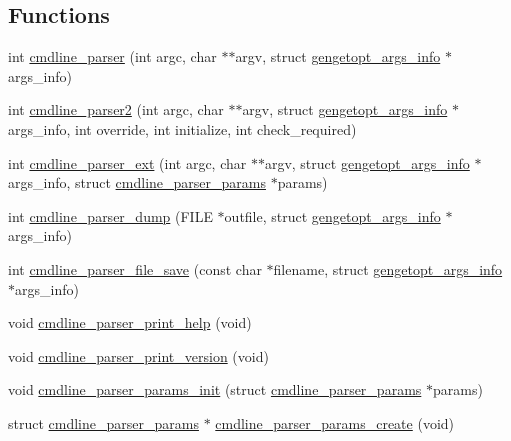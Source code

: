 \subsection*{Functions}
\begin{DoxyCompactItemize}
\item 
int \hyperlink{aes-getopt_8h_a3c3df73307452c51fee0a34640d92196}{cmdline\+\_\+parser} (int argc, char $\ast$$\ast$argv, struct \hyperlink{structgengetopt__args__info}{gengetopt\+\_\+args\+\_\+info} $\ast$args\+\_\+info)
\item 
int \hyperlink{aes-getopt_8h_a78a0cd581698415a62f68214603b1a30}{cmdline\+\_\+parser2} (int argc, char $\ast$$\ast$argv, struct \hyperlink{structgengetopt__args__info}{gengetopt\+\_\+args\+\_\+info} $\ast$args\+\_\+info, int override, int initialize, int check\+\_\+required)
\item 
int \hyperlink{aes-getopt_8h_ac7bb5d76f3f56d1c0b3b531f11ac6f07}{cmdline\+\_\+parser\+\_\+ext} (int argc, char $\ast$$\ast$argv, struct \hyperlink{structgengetopt__args__info}{gengetopt\+\_\+args\+\_\+info} $\ast$args\+\_\+info, struct \hyperlink{structcmdline__parser__params}{cmdline\+\_\+parser\+\_\+params} $\ast$params)
\item 
int \hyperlink{aes-getopt_8h_a1f73418092a6e6eb3706aa0de2785e11}{cmdline\+\_\+parser\+\_\+dump} (F\+I\+LE $\ast$outfile, struct \hyperlink{structgengetopt__args__info}{gengetopt\+\_\+args\+\_\+info} $\ast$args\+\_\+info)
\item 
int \hyperlink{aes-getopt_8h_a5f3e9412f88f1058a31ac28ad2ea2818}{cmdline\+\_\+parser\+\_\+file\+\_\+save} (const char $\ast$filename, struct \hyperlink{structgengetopt__args__info}{gengetopt\+\_\+args\+\_\+info} $\ast$args\+\_\+info)
\item 
void \hyperlink{aes-getopt_8h_ad4f7db2fa4002379eb30e5206f3b7492}{cmdline\+\_\+parser\+\_\+print\+\_\+help} (void)
\item 
void \hyperlink{aes-getopt_8h_a96f27bf35ce0ab8eea7a1f6e6b59a5e2}{cmdline\+\_\+parser\+\_\+print\+\_\+version} (void)
\item 
void \hyperlink{aes-getopt_8h_af72b814611cffc706b2135ccdfe7e997}{cmdline\+\_\+parser\+\_\+params\+\_\+init} (struct \hyperlink{structcmdline__parser__params}{cmdline\+\_\+parser\+\_\+params} $\ast$params)
\item 
struct \hyperlink{structcmdline__parser__params}{cmdline\+\_\+parser\+\_\+params} $\ast$ \hyperlink{aes-getopt_8h_afd778af110fe0ee1ea5eac7aa9939d92}{cmdline\+\_\+parser\+\_\+params\+\_\+create} (void)
\item 
$$
\end{DoxyCompactItemize}
